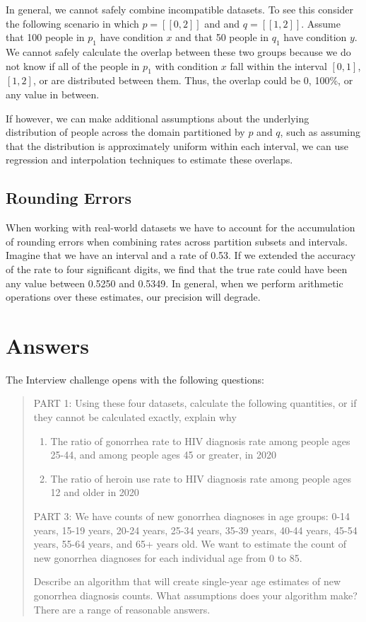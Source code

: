 \documentclass[]{article}
\begin{document}
In general, we cannot safely combine incompatible datasets. To see this
consider the following scenario in which \(p = [[0, 2]]\) and and
\(q = [[1, 2]]\). Assume that 100 people in \(p_1\) have condition \(x\)
and that 50 people in \(q_1\) have condition \(y\). We cannot safely
calculate the overlap between these two groups because we do not know if
all of the people in \(p_1\) with condition \(x\) fall within the
interval \([0, 1]\), \([1, 2]\), or are distributed between them. Thus,
the overlap could be 0, 100\%, or any value in between.

If however, we can make additional assumptions about the underlying
distribution of people across the domain partitioned by \(p\) and \(q\),
such as assuming that the distribution is approximately uniform within
each interval, we can use regression and interpolation techniques to
estimate these overlaps.

\hypertarget{rounding-errors}{%
\subsection{Rounding Errors}\label{rounding-errors}}

When working with real-world datasets we have to account for the
accumulation of rounding errors when combining rates across partition
subsets and intervals. Imagine that we have an interval and a rate of
0.53. If we extended the accuracy of the rate to four significant
digits, we find that the true rate could have been any value between
0.5250 and 0.5349. In general, when we perform arithmetic operations
over these estimates, our precision will degrade.

\hypertarget{answers}{%
\section{Answers}\label{answers}}

The Interview challenge opens with the following questions:

\begin{quote}
PART 1: Using these four datasets, calculate the following quantities,
or if they cannot be calculated exactly, explain why

\begin{enumerate}
\def\labelenumi{\arabic{enumi}.}
\item
  The ratio of gonorrhea rate to HIV diagnosis rate among people ages
  25-44, and among people ages 45 or greater, in 2020
\item
  The ratio of heroin use rate to HIV diagnosis rate among people ages
  12 and older in 2020
\end{enumerate}

PART 3: We have counts of new gonorrhea diagnoses in age groups: 0-14
years, 15-19 years, 20-24 years, 25-34 years, 35-39 years, 40-44 years,
45-54 years, 55-64 years, and 65+ years old. We want to estimate the
count of new gonorrhea diagnoses for each individual age from 0 to 85.

Describe an algorithm that will create single-year age estimates of new
gonorrhea diagnosis counts. What assumptions does your algorithm make?
There are a range of reasonable answers.
\end{quote}
\end{document}
